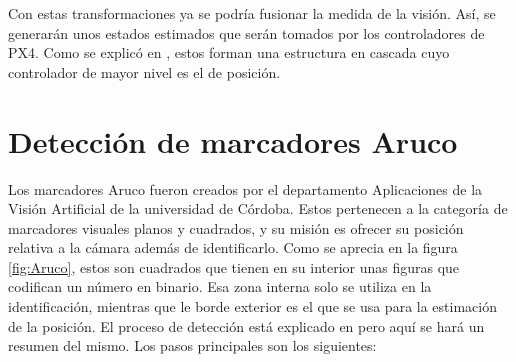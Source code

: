 Con estas transformaciones ya se podría fusionar la medida de la visión. Así, se generarán unos estados estimados que serán tomados por los controladores de PX4. Como se explicó en \cite{arias2019control}, estos forman una estructura en cascada cuyo controlador de mayor nivel es el de posición. 


\section{Detección de marcadores Aruco} \label{sec:detectAruco}
	Los marcadores Aruco fueron creados por el departamento Aplicaciones de la Visión Artificial de la universidad de Córdoba. Estos pertenecen a la categoría de marcadores visuales planos y cuadrados, y su misión es ofrecer su posición relativa a la cámara además de identificarlo. 
	Como se aprecia en la figura \ref{fig:Aruco}, estos son cuadrados que tienen en su interior unas figuras que codifican un número en binario. Esa zona interna solo se utiliza en la identificación, mientras que le borde exterior es el que se usa para la estimación de la posición. El proceso de detección está explicado en \cite{aruco2014} pero aquí se hará un resumen del mismo. Los pasos principales son los siguientes:
\figAruco
